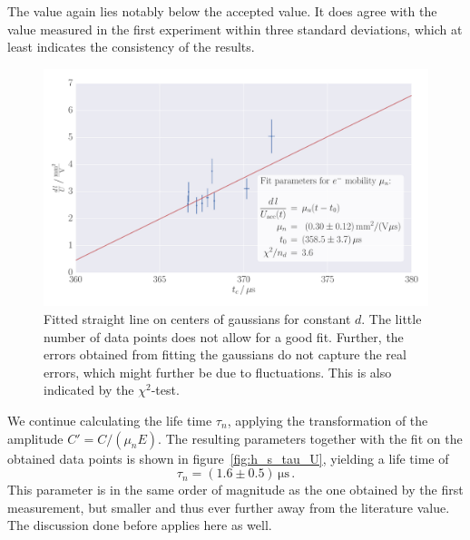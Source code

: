 The value again lies notably below the accepted value. It does agree 
with the value measured in the first experiment within three standard deviations, 
which at least indicates the consistency of the results. 
\begin{figure}
    \includegraphics[width=1.0\textwidth]{figures/haynes_shockley_mu_e_U}
    \caption{
        Fitted straight line on centers of gaussians for constant $d$.  
        The little number of data points does not allow for a good fit. 
        Further, the errors obtained from fitting the gaussians do not
        capture the real errors, which might further be due to 
        fluctuations. This is also indicated by the $\chi^2$-test.
        }
    \label{fig:h_s_mu_e_d}
\end{figure}
We continue calculating the life time $\tau_n$, applying the 
transformation of the amplitude $C' = C / (\mu_n E)$. The resulting 
parameters together with the fit on the obtained data points is shown 
in figure~\ref{fig:h_s_tau_U}, yielding a life time of 
\begin{equation}
    \tau_n = (1.6 \pm 0.5)\, \mathrm{\mu s} \, .
\end{equation}
This parameter is in the same order of magnitude as the one obtained 
by the first measurement, but smaller and thus ever further away from 
the literature value. The discussion done before applies here as well. 
